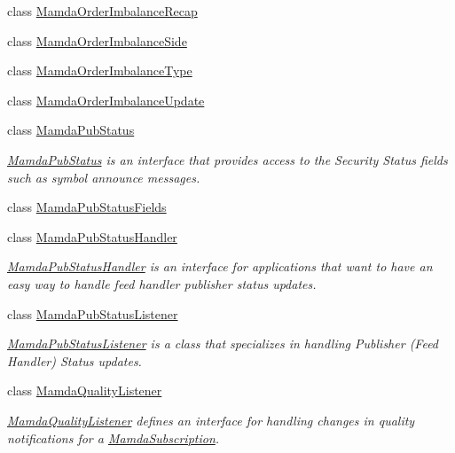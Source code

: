 \begin{CompactItemize}
class \hyperlink{classWombat_1_1MamdaOrderImbalanceRecap}{Mamda\-Order\-Imbalance\-Recap}
\item 
class \hyperlink{classWombat_1_1MamdaOrderImbalanceSide}{Mamda\-Order\-Imbalance\-Side}
\item 
class \hyperlink{classWombat_1_1MamdaOrderImbalanceType}{Mamda\-Order\-Imbalance\-Type}
\item 
class \hyperlink{classWombat_1_1MamdaOrderImbalanceUpdate}{Mamda\-Order\-Imbalance\-Update}
\item 
class \hyperlink{classWombat_1_1MamdaPubStatus}{Mamda\-Pub\-Status}
\begin{CompactList}\small\item\em \hyperlink{classWombat_1_1MamdaPubStatus}{Mamda\-Pub\-Status} is an interface that provides access to the Security Status fields such as symbol announce messages. \item\end{CompactList}\item 
class \hyperlink{classWombat_1_1MamdaPubStatusFields}{Mamda\-Pub\-Status\-Fields}
\item 
class \hyperlink{classWombat_1_1MamdaPubStatusHandler}{Mamda\-Pub\-Status\-Handler}
\begin{CompactList}\small\item\em \hyperlink{classWombat_1_1MamdaPubStatusHandler}{Mamda\-Pub\-Status\-Handler} is an interface for applications that want to have an easy way to handle feed handler publisher status updates. \item\end{CompactList}\item 
class \hyperlink{classWombat_1_1MamdaPubStatusListener}{Mamda\-Pub\-Status\-Listener}
\begin{CompactList}\small\item\em \hyperlink{classWombat_1_1MamdaPubStatusListener}{Mamda\-Pub\-Status\-Listener} is a class that specializes in handling Publisher (Feed Handler) Status updates. \item\end{CompactList}\item 
class \hyperlink{classWombat_1_1MamdaQualityListener}{Mamda\-Quality\-Listener}
\begin{CompactList}\small\item\em \hyperlink{classWombat_1_1MamdaQualityListener}{Mamda\-Quality\-Listener} defines an interface for handling changes in quality notifications for a \hyperlink{classWombat_1_1MamdaSubscription}{Mamda\-Subscription}. \item\end{CompactList}\item 

\end{CompactItemize}
